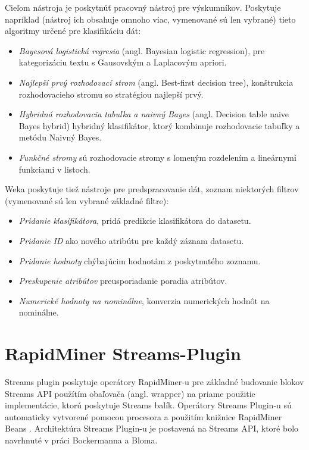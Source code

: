 Cieľom nástroja je poskytnúť pracovný nástroj pre výskumníkov. Poskytuje napríklad (nástroj ich obsahuje omnoho viac, vymenované sú len vybrané) tieto algoritmy určené pre klasifikáciu dát:
\begin{itemize}
	\item \textit{Bayesová logistická regresia} (angl. Bayesian logistic regression), pre kategorizáciu textu s Gausovským a Laplacovým apriori.
	\item \textit{Najlepší prvý rozhodovací strom} (angl. Best-first decision tree), konštrukcia rozhodovacieho stromu so stratégiou najlepší prvý.
	\item \textit{Hybridná rozhodovacia tabuľka a naivný Bayes} (angl. Decision table naive Bayes hybrid) hybridný klasifikátor, ktorý kombinuje rozhodovacie tabuľky a metódu Naivný Bayes.
	\item \textit{Funkčné stromy} sú rozhodovacie stromy s lomeným rozdelením a lineárnymi funkciami v listoch.
\end{itemize}
Weka poskytuje tiež nástroje pre predspracovanie dát, zoznam niektorých filtrov (vymenované sú len vybrané základné filtre):
\begin{itemize}
	\item \textit{Pridanie klasifikátora}, pridá predikcie klasifikátora do datasetu.
	\item \textit{Pridanie ID} ako nového atribútu pre každý záznam datasetu.
	\item \textit{Pridanie hodnoty} chýbajúcim hodnotám z poskytnutého zoznamu.
	\item \textit{Preskupenie atribútov} preusporiadanie poradia atribútov.
	\item \textit{Numerické hodnoty na nominálne}, konverzia numerických hodnôt na nominálne.
\end{itemize}
\label{fig:weka}

\newpage
\section{RapidMiner Streams-Plugin}
Streams plugin poskytuje operátory RapidMiner-u pre základné budovanie blokov Streams API použítím obaľovača (angl. wrapper) na priame použitie implementácie, ktorú poskytuje Streams balík. Operátory Streams Plugin-u sú automaticky vytvorené pomocou procesora a použitím knižnice RapidMiner Beans \citep{bockermann2012processing}. Architektúra Streams Plugin-u je postavená na Streams API, ktoré bolo navrhnuté v práci Bockermanna a Bloma.
\label{fig:rapidminer}

